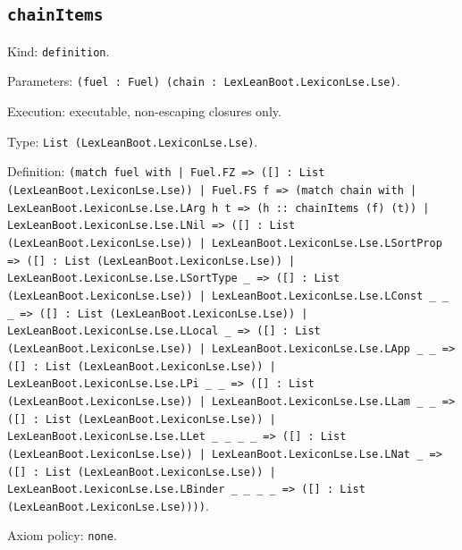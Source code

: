 \documentclass[11pt]{article}
\begin{document}
\subsection*{\texttt{chainItems}}
\noindent Kind: \texttt{definition}.\par
\noindent Parameters: \texttt{(fuel : Fuel) (chain : LexLeanBoot.LexiconLse.Lse)}.\par
\noindent Execution: executable, non-escaping closures only.\par
\noindent Type: \texttt{List (LexLeanBoot.LexiconLse.Lse)}.\par
\noindent Definition: \texttt{(match fuel with | Fuel.FZ => ([] : List (LexLeanBoot.LexiconLse.Lse)) | Fuel.FS f => (match chain with | LexLeanBoot.LexiconLse.Lse.LArg h t => (h :: chainItems (f) (t)) | LexLeanBoot.LexiconLse.Lse.LNil => ([] : List (LexLeanBoot.LexiconLse.Lse)) | LexLeanBoot.LexiconLse.Lse.LSortProp => ([] : List (LexLeanBoot.LexiconLse.Lse)) | LexLeanBoot.LexiconLse.Lse.LSortType \_ => ([] : List (LexLeanBoot.LexiconLse.Lse)) | LexLeanBoot.LexiconLse.Lse.LConst \_ \_ \_ => ([] : List (LexLeanBoot.LexiconLse.Lse)) | LexLeanBoot.LexiconLse.Lse.LLocal \_ => ([] : List (LexLeanBoot.LexiconLse.Lse)) | LexLeanBoot.LexiconLse.Lse.LApp \_ \_ => ([] : List (LexLeanBoot.LexiconLse.Lse)) | LexLeanBoot.LexiconLse.Lse.LPi \_ \_ => ([] : List (LexLeanBoot.LexiconLse.Lse)) | LexLeanBoot.LexiconLse.Lse.LLam \_ \_ => ([] : List (LexLeanBoot.LexiconLse.Lse)) | LexLeanBoot.LexiconLse.Lse.LLet \_ \_ \_ \_ => ([] : List (LexLeanBoot.LexiconLse.Lse)) | LexLeanBoot.LexiconLse.Lse.LNat \_ => ([] : List (LexLeanBoot.LexiconLse.Lse)) | LexLeanBoot.LexiconLse.Lse.LBinder \_ \_ \_ \_ => ([] : List (LexLeanBoot.LexiconLse.Lse))))}.\par
\noindent Axiom policy: \texttt{none}.\par
\end{document}
